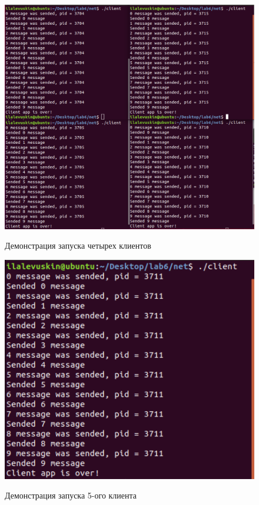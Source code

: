 \documentclass[a4paper,12pt]{article}
\begin{document}
	\begin{figure}[h!]
		\begin{center}
			{\includegraphics[scale = 0.5]{test_client_1_2.png}}
			\label{ris:test_client_1_2}
			\caption{Демонстрация запуска четырех клиентов}
		\end{center}
	\end{figure}
	
	\begin{figure}[h!]
		\begin{center}
			{\includegraphics[scale = 0.7]{test_client_2_2.png}}
			\label{ris:test_client_2_2}
			\caption{Демонстрация запуска 5-ого клиента}
		\end{center}
	\end{figure}
	
\end{document}

